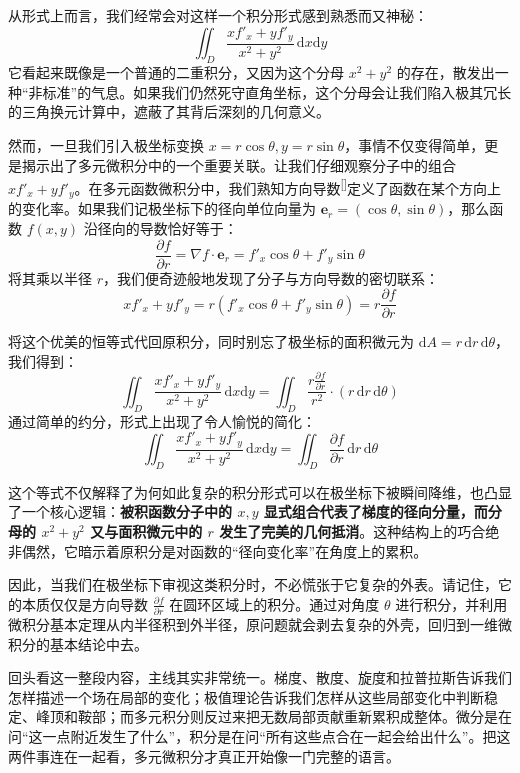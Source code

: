 \documentclass[UTF8]{ctexbook}
\begin{document}
从形式上而言，我们经常会对这样一个积分形式感到熟悉而又神秘：
\[
 \iint_D \frac{x f'_x + y f'_y}{x^2 + y^2} \, \mathrm{d}x\mathrm{d}y 
\]
它看起来既像是一个普通的二重积分，又因为这个分母 \(x^2 + y^2\) 的存在，散发出一种“非标准”的气息。如果我们仍然死守直角坐标，这个分母会让我们陷入极其冗长的三角换元计算中，遮蔽了其背后深刻的几何意义。

然而，一旦我们引入极坐标变换 \(x = r\cos\theta, y = r\sin\theta\)，事情不仅变得简单，更是揭示出了多元微积分中的一个重要关联。让我们仔细观察分子中的组合 \(x f'_x + y f'_y\)。在多元函数微积分中，我们熟知方向导数\textsuperscript{[\pageref{directional_derivative}]}定义了函数在某个方向上的变化率。如果我们记极坐标下的径向单位向量为 \(\mathbf{e}_r = (\cos\theta, \sin\theta)\)，那么函数 \(f(x,y)\) 沿径向的导数恰好等于：
\[
 \frac{\partial f}{\partial r} = \nabla f \cdot \mathbf{e}_r = f'_x \cos\theta + f'_y \sin\theta 
\]
将其乘以半径 \(r\)，我们便奇迹般地发现了分子与方向导数的密切联系：
\[
 x f'_x + y f'_y = r \left( f'_x \cos\theta + f'_y \sin\theta \right) = r \frac{\partial f}{\partial r} 
\]

将这个优美的恒等式代回原积分，同时别忘了极坐标的面积微元为 \(\mathrm{d}A = r\,\mathrm{d}r\,\mathrm{d}\theta\)，我们得到：
\[
 \iint_D \frac{x f'_x + y f'_y}{x^2 + y^2} \, \mathrm{d}x\mathrm{d}y = \iint_D \frac{r \frac{\partial f}{\partial r}}{r^2} \cdot \left( r\,\mathrm{d}r\,\mathrm{d}\theta \right) 
\]
通过简单的约分，形式上出现了令人愉悦的简化：
\[
 \iint_D \frac{x f'_x + y f'_y}{x^2 + y^2} \, \mathrm{d}x\mathrm{d}y = \iint_D \frac{\partial f}{\partial r} \, \mathrm{d}r \, \mathrm{d}\theta 
\]

这个等式不仅解释了为何如此复杂的积分形式可以在极坐标下被瞬间降维，也凸显了一个核心逻辑：\textbf{被积函数分子中的 \(x,y\) 显式组合代表了梯度的径向分量，而分母的 \(x^2+y^2\) 又与面积微元中的 \(r\) 发生了完美的几何抵消}。这种结构上的巧合绝非偶然，它暗示着原积分是对函数的“径向变化率”在角度上的累积。

因此，当我们在极坐标下审视这类积分时，不必慌张于它复杂的外表。请记住，它的本质仅仅是方向导数 \(\frac{\partial f}{\partial r}\) 在圆环区域上的积分。通过对角度 \(\theta\) 进行积分，并利用微积分基本定理从内半径积到外半径，原问题就会剥去复杂的外壳，回归到一维微积分的基本结论中去。

回头看这一整段内容，主线其实非常统一。梯度、散度、旋度和拉普拉斯告诉我们怎样描述一个场在局部的变化；极值理论告诉我们怎样从这些局部变化中判断稳定、峰顶和鞍部；而多元积分则反过来把无数局部贡献重新累积成整体。微分是在问“这一点附近发生了什么”，积分是在问“所有这些点合在一起会给出什么”。把这两件事连在一起看，多元微积分才真正开始像一门完整的语言。
\end{document}
